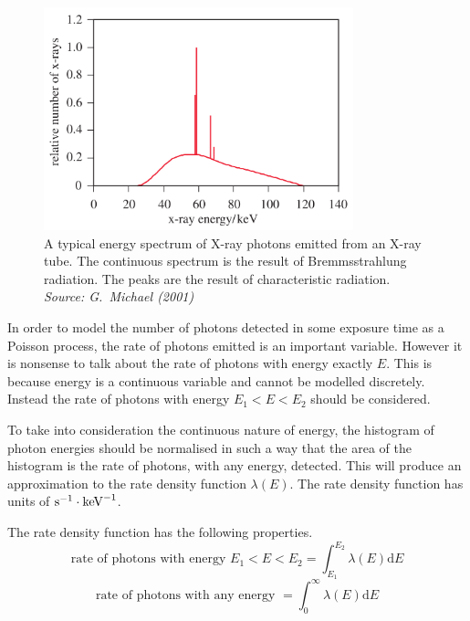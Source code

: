 \documentclass[12pt]{report}
\newcommand{\diff}{\mathrm{d}}
\begin{document}
\begin{figure}
\centering
\includegraphics[width=0.8\textwidth]{figures/x_ray_spectrum.png}
\caption{A typical energy spectrum of X-ray photons emitted from an X-ray tube. The continuous spectrum is the result of Bremmsstrahlung radiation. The peaks are the result of characteristic radiation. \emph{Source: G.~Michael (2001) \cite{michael2001x}}}
\label{fig:x_ray_spectrum2}
\end{figure}

In order to model the number of photons detected in some exposure time as a Poisson process, the rate of photons emitted is an important variable. However it is nonsense to talk about the rate of photons with energy exactly $E$. This is because energy is a continuous variable and cannot be modelled discretely. Instead the rate of photons with energy $E_1<E<E_2$ should be considered.

To take into consideration the continuous nature of energy, the histogram of photon energies should be normalised in such a way that the area of the histogram is the rate of photons, with any energy, detected. This will produce an approximation to the rate density function $\lambda(E)$. The rate density function has units of $\textup{s}^{-1}\cdot\textup{keV}^{-1}$.

The rate density function has the following properties.
\begin{equation}
\text{rate of photons with energy }E_1<E<E_2=
\int_{E_1}^{E_2}\lambda(E)\diff E
\end{equation}
\begin{equation}
\text{rate of photons with any energy }=
\int_{0}^{\infty}\lambda(E)\diff E
\end{equation}
\end{document}
